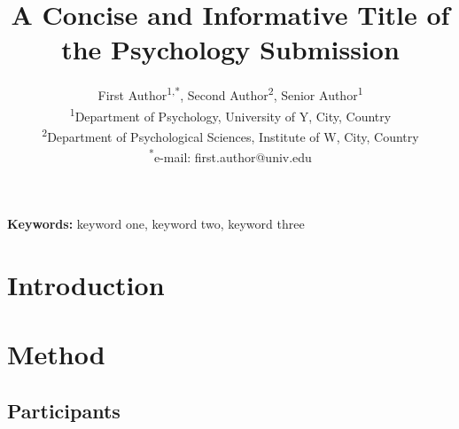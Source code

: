 \documentclass[11pt,a4paper]{article}
\title{A Concise and Informative Title of the Psychology Submission}
\author{First Author\textsuperscript{1,*}, Second Author\textsuperscript{2}, Senior Author\textsuperscript{1}\\
\textsuperscript{1}Department of Psychology, University of Y, City, Country\\
\textsuperscript{2}Department of Psychological Sciences, Institute of W, City, Country\\
\textsuperscript{*}e-mail: first.author@univ.edu}
\date{}
\begin{document}
\maketitle

\begin{abstract}
\end{abstract}

\noindent\textbf{Keywords:} %
keyword one, keyword two, keyword three

\section{Introduction}
\label{sec:intro}

\section{Method}
\label{sec:method}

\subsection{Participants}
\end{document}
